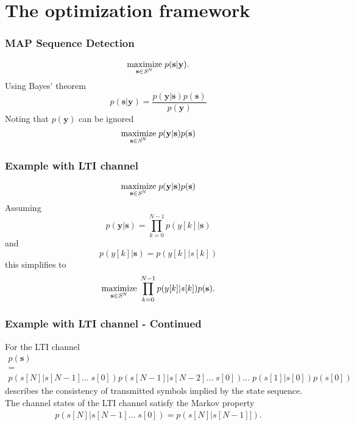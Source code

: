 \documentclass[10pt,tgadventor, onlymath]{beamer}
\begin{document}
\section{The optimization framework}

\begin{frame}
\frametitle{MAP Sequence Detection}
\begin{equation*}
\underset{\mathbf{s}\in\textit{\cal{S}}^N}{\text{maximize}} \; p(\mathbf{s}|\mathbf{y}).
\end{equation*} 
\pause
Using Bayes' theorem
\begin{equation*}
p(\mathbf{s}|\mathbf{y}) = 
\frac
{p(\mathbf{y}|\mathbf{s})p(\mathbf{s})}
{p(\mathbf{y})}
\end{equation*} 
Noting that $p(\mathbf{y})$ can be ignored 
\pause
\begin{equation}\label{opt_problem}
\underset{\mathbf{s}\in\textit{\cal{S}}^N}{\text{maximize}}\; p(\mathbf{y}|\mathbf{s})p(\mathbf{s})
\end{equation}

\end{frame}

\begin{frame}
\frametitle{Example with LTI channel}
\begin{equation*}\label{opt_problem}
\underset{\mathbf{s}\in\textit{\cal{S}}^N}{\text{maximize}}\; p(\mathbf{y}|\mathbf{s})p(\mathbf{s})
\end{equation*}
Assuming 
\begin{equation*}
p(\mathbf{y}|\mathbf{s}) = \prod_{k=0}^{N-1} p(y[k]|\mathbf{s})
\end{equation*}
and 
\begin{equation*}
p(y[k]|\mathbf{s}) = p(y[k]|s[k])
\end{equation*}
this simplifies to 
\begin{equation*}\label{opt_problem}
\underset{\mathbf{s}\in\textit{\cal{S}}^N}{\text{maximize}}\; \prod_{k=0}^{N-1} p(y[k]|s[k])p(\mathbf{s}).
\end{equation*}
\end{frame}

\begin{frame}
\frametitle{Example with LTI channel - Continued}
For the LTI channel
\begin{gather*}
p(\mathbf{s}) \\=\\
 p(s[N]| s[N-1]... \; s[0]) p(s[N-1]| s[N-2]... \; s[0])... \; p(s[1]| s[0])p(s[0])
\end{gather*}
describes the consistency of transmitted symbols implied by the state sequence.
\\
The channel states of the LTI channel satisfy the Markov property 
\begin{gather*}
 p(s[N]| s[N-1]... \; s[0]) =  p(s[N]| s[N-1]]).
\end{gather*}

\end{frame}
\end{document}
